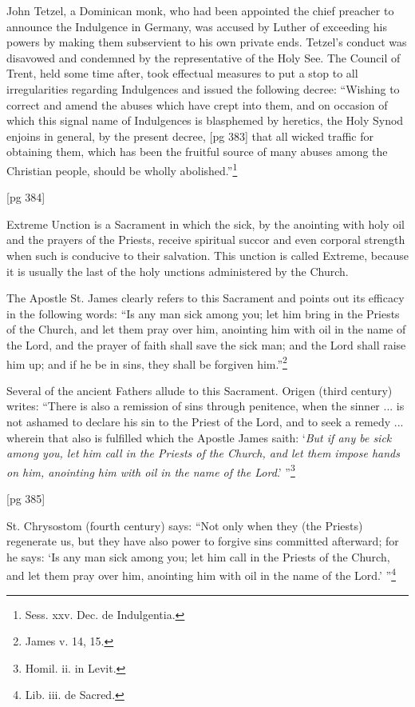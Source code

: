 John Tetzel, a Dominican monk, who had been
appointed the chief preacher to announce the Indulgence
in Germany, was accused by Luther of
exceeding his powers by making them subservient
to his own private ends. Tetzel's conduct was
disavowed and condemned by the representative of
the Holy See. The Council of Trent, held some
time after, took effectual measures to put a stop
to all irregularities regarding Indulgences and issued
the following decree: “Wishing to correct
and amend the abuses which have crept into them,
and on occasion of which this signal name of Indulgences
is blasphemed by heretics, the Holy
Synod enjoins in general, by the present decree,
[pg 383]
that all wicked traffic for obtaining them, which
has been the fruitful source of many abuses among
the Christian people, should be wholly abolished.”\footnote{Sess.
xxv. Dec. de Indulgentia.}

[pg 384]


Extreme Unction is a Sacrament in which
the sick, by the anointing with holy oil and
the prayers of the Priests, receive spiritual
succor and even corporal strength when such is
conducive to their salvation. This unction is
called Extreme, because it is usually the last of
the holy unctions administered by the Church.

The Apostle St. James clearly refers to this
Sacrament and points out its efficacy in the following
words: “Is any man sick among you; let
him bring in the Priests of the Church, and let
them pray over him, anointing him with oil in the
name of the Lord, and the prayer of faith shall
save the sick man; and the Lord shall raise him
up; and if he be in sins, they shall be forgiven
him.”\footnote{James v. 14, 15.}

Several of the ancient Fathers allude to this
Sacrament. Origen (third century) writes:
“There is also a remission of sins through penitence,
when the sinner ... is not ashamed to declare
his sin to the Priest of the Lord, and to seek
a remedy ... wherein that also is fulfilled which
the Apostle James saith: ‘\emph{But if any be sick
among you, let him call in the Priests of the
Church, and let them impose hands on him, anointing
him with oil in the name of the Lord}.’ ”\footnote{Homil.
ii. in Levit.}

[pg 385]

St. Chrysostom (fourth century) says: “Not
only when they (the Priests) regenerate us, but
they have also power to forgive sins committed
afterward; for he says: ‘Is any man sick among
you; let him call in the Priests of the Church, and
let them pray over him, anointing him with oil in
the name of the Lord.’ ”\footnote{Lib. iii. de Sacred.}

